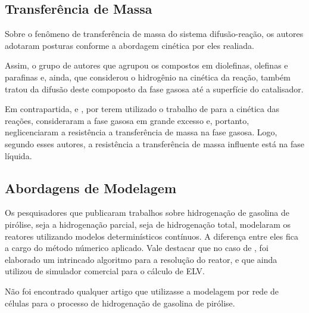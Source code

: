 \subsection{Transferência de Massa} \label{sec:transferenciamassa}

Sobre o fenômeno de transferência de massa do sistema difusão-reação, 
os autores adotaram posturas conforme a abordagem cinética por eles realiada.

Assim, o grupo de autores que agrupou os compostos em diolefinas, olefinas e
parafinas \cite{Arpornwichanop2002, Authayanun2008} e, ainda, que considerou o
hidrogênio na cinética da reação, também tratou da difusão deste compoposto da
fase gasosa até a superfície do catalisador. 

Em contrapartida,  e , por
terem utilizado o trabalho de  para a cinética das
reações, consideraram a fase gasosa em grande excesso e, portanto,
neglicenciaram a resistência a transferência de massa na fase gasosa.
Logo, segundo esses autores, a resistência a transferência de massa influente
está na fase líquida.

\subsection{Abordagens de Modelagem} \label{sec:abordagensmodelagem}

Os pesquisadores que publicaram trabalhos sobre hidrogenação de gasolina
de pirólise, seja a hidrogenação parcial, seja de hidrogenação total, modelaram
os reatores utilizando modelos determinísticos contínuos. A diferença entre
eles fica a cargo do método númerico aplicado. Vale destacar que no caso de
, foi elaborado um intrincado algoritmo para a resolução
do reator, e que ainda utilizou de simulador comercial para o cálculo de ELV.

Não foi encontrado qualquer artigo que utilizasse a modelagem por rede de
células para o processo de hidrogenação de gasolina de pirólise.




